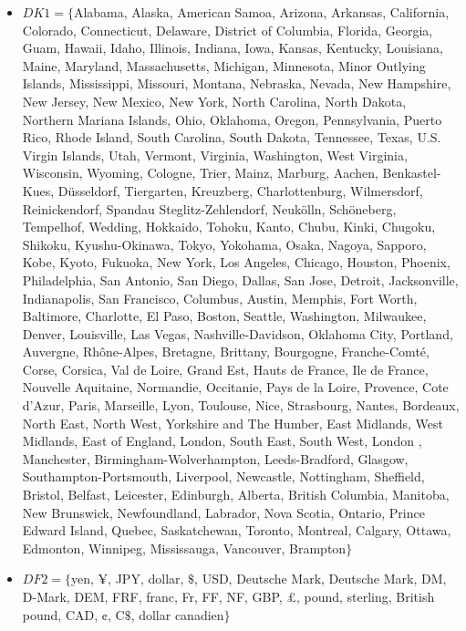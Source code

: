 \documentclass{classrep}
\begin{document}
\begin{itemize}
\item $DK1 = \{$Alabama, Alaska, American Samoa, Arizona, Arkansas, California, Colorado, Connecticut, Delaware, District of Columbia, Florida, Georgia, Guam, Hawaii, Idaho, Illinois, Indiana, Iowa, Kansas, Kentucky, Louisiana, Maine, Maryland, Massachusetts, Michigan, Minnesota, Minor Outlying Islands, Mississippi, Missouri, Montana, Nebraska, Nevada, New Hampshire, New Jersey, New Mexico, New York, North Carolina, North Dakota, Northern Mariana Islands, Ohio, Oklahoma, Oregon, Pennsylvania, Puerto Rico, Rhode Island, South Carolina, South Dakota, Tennessee, Texas, U.S. Virgin Islands, Utah, Vermont, Virginia, Washington, West Virginia, Wisconsin, Wyoming, Cologne, Trier, Mainz, Marburg, Aachen, Benkastel-Kues, Düsseldorf, Tiergarten, Kreuzberg, Charlottenburg, Wilmersdorf, Reinickendorf, Spandau Steglitz-Zehlendorf, Neukölln, Schöneberg, Tempelhof, Wedding, Hokkaido, Tohoku, Kanto, Chubu, Kinki, Chugoku, Shikoku, Kyushu-Okinawa, Tokyo, Yokohama, Osaka, Nagoya, Sapporo, Kobe, Kyoto, Fukuoka, New York, Los Angeles, Chicago, Houston, Phoenix, Philadelphia, San Antonio, San Diego, Dallas, San Jose, Detroit, Jacksonville, Indianapolis, San Francisco, Columbus, Austin, Memphis, Fort Worth, Baltimore, Charlotte, El Paso, Boston, Seattle, Washington, Milwaukee, Denver, Louisville, Las Vegas, Nashville-Davidson, Oklahoma City, Portland, Auvergne, Rhône-Alpes, Bretagne, Brittany, Bourgogne, Franche-Comté, Corse, Corsica, Val de Loire, Grand Est, Hauts de France, Ile de France, Nouvelle Aquitaine, Normandie, Occitanie, Pays de la Loire, Provence, Cote d'Azur, Paris, Marseille, Lyon, Toulouse, Nice, Strasbourg, Nantes, Bordeaux, North East, North West, Yorkshire and The Humber, East Midlands, West Midlands, East of England, London, South East, South West, London , Manchester, Birmingham-Wolverhampton, Leeds-Bradford, Glasgow, Southampton-Portsmouth, Liverpool, Newcastle, Nottingham, Sheffield, Bristol, Belfast, Leicester, Edinburgh, Alberta, British Columbia, Manitoba, New Brunswick, Newfoundland, Labrador, Nova Scotia, Ontario, Prince Edward Island, Quebec, Saskatchewan, Toronto, Montreal, Calgary, Ottawa, Edmonton, Winnipeg, Mississauga, Vancouver, Brampton$\} $
\item $DF2 = \{$yen, ¥, JPY, dollar, $\$$, USD, Deutsche Mark, Deutsche Mark, DM, D-Mark, DEM, FRF, franc, Fr, FF, NF, GBP, £, pound, sterling, British pound, CAD, ¢, C$\$$, dollar canadien$\} $

\end{itemize}
\end{document}
